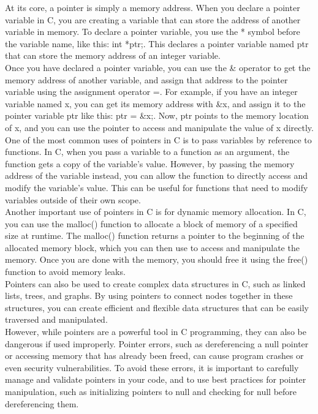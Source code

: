 \documentclass[
	12pt, %
]{fphw}
\begin{document}
At its core, a pointer is simply a memory address. When you declare a pointer 
variable in C, you are creating a variable that can store the address of 
another variable in memory. To declare a pointer variable, you use the * 
symbol before the variable name, like this: int *ptr;. This declares a pointer
variable named ptr that can store the memory address of an integer variable.\\

Once you have declared a pointer variable, you can use the \& operator to get 
the memory address of another variable, and assign that address to the pointer
variable using the assignment operator =. For example, if you have an integer 
variable named x, you can get its memory address with \&x, and assign it to the 
pointer variable ptr like this: ptr = \&x;. Now, ptr points to the memory 
location of x, and you can use the pointer to access and manipulate the value 
of x directly.\\

One of the most common uses of pointers in C is to pass variables by 
reference to functions. In C, when you pass a variable to a function as an 
argument, the function gets a copy of the variable's value. However, by 
passing the memory address of the variable instead, you can allow the function 
to directly access and modify the variable's value. This can be useful for 
functions that need to modify variables outside of their own scope.\\

Another important use of pointers in C is for dynamic memory allocation. In C,
you can use the malloc() function to allocate a block of memory of a specified 
size at runtime. The malloc() function returns a pointer to the beginning of 
the allocated memory block, which you can then use to access and manipulate 
the memory. Once you are done with the memory, you should free it using the 
free() function to avoid memory leaks.\\

Pointers can also be used to create complex data structures in C, such as 
linked lists, trees, and graphs. By using pointers to connect nodes together 
in these structures, you can create efficient and flexible data structures 
that can be easily traversed and manipulated.\\

However, while pointers are a powerful tool in C programming, they can also be
dangerous if used improperly. Pointer errors, such as dereferencing a null 
pointer or accessing memory that has already been freed, can cause program 
crashes or even security vulnerabilities. To avoid these errors, it is 
important to carefully manage and validate pointers in your code, and to use 
best practices for pointer manipulation, such as initializing pointers to null
and checking for null before dereferencing them.\\
\end{document}
